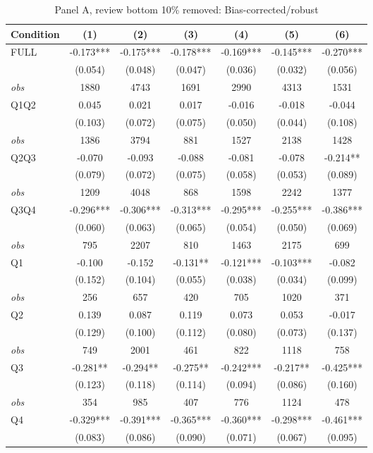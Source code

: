 \begin{table}[!htbp]
\centering
\caption{Panel A, review bottom 10\% removed: Bias-corrected/robust}
\begin{tabular}{lcccccc}
\toprule
Condition & (1) & (2) & (3) & (4) & (5) & (6) \\
\midrule
FULL & -0.173*** & -0.175*** & -0.178*** & -0.169*** & -0.145*** & -0.270*** \\
 & (0.054) & (0.048) & (0.047) & (0.036) & (0.032) & (0.056) \\
\textit{obs} & 1880 & 4743 & 1691 & 2990 & 4313 & 1531 \\
Q1Q2 & 0.045 & 0.021 & 0.017 & -0.016 & -0.018 & -0.044 \\
 & (0.103) & (0.072) & (0.075) & (0.050) & (0.044) & (0.108) \\
\textit{obs} & 1386 & 3794 & 881 & 1527 & 2138 & 1428 \\
Q2Q3 & -0.070 & -0.093 & -0.088 & -0.081 & -0.078 & -0.214** \\
 & (0.079) & (0.072) & (0.075) & (0.058) & (0.053) & (0.089) \\
\textit{obs} & 1209 & 4048 & 868 & 1598 & 2242 & 1377 \\
Q3Q4 & -0.296*** & -0.306*** & -0.313*** & -0.295*** & -0.255*** & -0.386*** \\
 & (0.060) & (0.063) & (0.065) & (0.054) & (0.050) & (0.069) \\
\textit{obs} & 795 & 2207 & 810 & 1463 & 2175 & 699 \\
Q1 & -0.100 & -0.152 & -0.131** & -0.121*** & -0.103*** & -0.082 \\
 & (0.152) & (0.104) & (0.055) & (0.038) & (0.034) & (0.099) \\
\textit{obs} & 256 & 657 & 420 & 705 & 1020 & 371 \\
Q2 & 0.139 & 0.087 & 0.119 & 0.073 & 0.053 & -0.017 \\
 & (0.129) & (0.100) & (0.112) & (0.080) & (0.073) & (0.137) \\
\textit{obs} & 749 & 2001 & 461 & 822 & 1118 & 758 \\
Q3 & -0.281** & -0.294** & -0.275** & -0.242*** & -0.217** & -0.425*** \\
 & (0.123) & (0.118) & (0.114) & (0.094) & (0.086) & (0.160) \\
\textit{obs} & 354 & 985 & 407 & 776 & 1124 & 478 \\
Q4 & -0.329*** & -0.391*** & -0.365*** & -0.360*** & -0.298*** & -0.461*** \\
 & (0.083) & (0.086) & (0.090) & (0.071) & (0.067) & (0.095) \\

\end{tabular}
\end{table}
